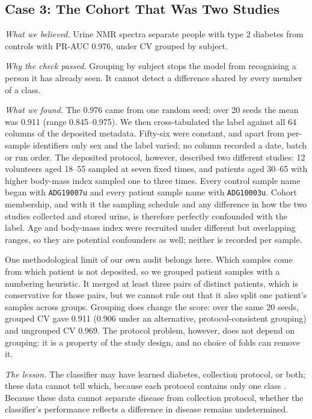 \documentclass[conference]{IEEEtran}
\begin{document}
\subsection{Case 3: The Cohort That Was Two Studies}
\label{sec:case3}

\emph{What we believed.} Urine NMR spectra separate people with type 2
diabetes from controls with PR-AUC 0.976, under CV grouped by subject.

\emph{Why the check passed.} Grouping by subject stops the model from
recognising a person it has already seen. It cannot detect a difference
shared by every member of a class.

\emph{What we found.} The 0.976 came from one random seed; over 20 seeds the
mean was 0.911 (range 0.845--0.975). We then cross-tabulated the label
against all 64 columns of the deposited metadata. Fifty-six were constant,
and apart from per-sample identifiers only sex and the label varied; no
column recorded a date, batch or run order. The deposited protocol, however,
described two different studies: 12 volunteers aged 18--55 sampled at seven
fixed times, and patients aged 30--65 with higher body-mass index sampled
one to three times. Every control sample name began with \texttt{ADG19007u}
and every patient sample name with \texttt{ADG10003u}. Cohort membership,
and with it the sampling schedule and any difference in how the two studies
collected and stored urine, is therefore perfectly confounded with the
label. Age and body-mass index were recruited under different but
overlapping ranges, so they are potential confounders as well; neither is
recorded per sample.

One methodological limit of our own audit belongs here. Which samples come
from which patient is not deposited, so we grouped patient samples with a
numbering heuristic. It merged at least three pairs of distinct patients,
which is conservative for those pairs, but we cannot rule out that it also
split one patient's samples across groups. Grouping does change the score:
over the same 20 seeds, grouped CV gave 0.911 (0.906 under an alternative,
protocol-consistent grouping) and ungrouped CV 0.969. The protocol problem,
however, does not depend on grouping: it is a property of the study design,
and no choice of folds can remove it.

\emph{The lesson.} The classifier may have learned diabetes, collection
protocol, or both; these data cannot tell which, because each protocol
contains only one class \cite{leek2010}. Because these data cannot separate
disease from collection protocol, whether the classifier's performance
reflects a difference in disease remains undetermined.
\end{document}
